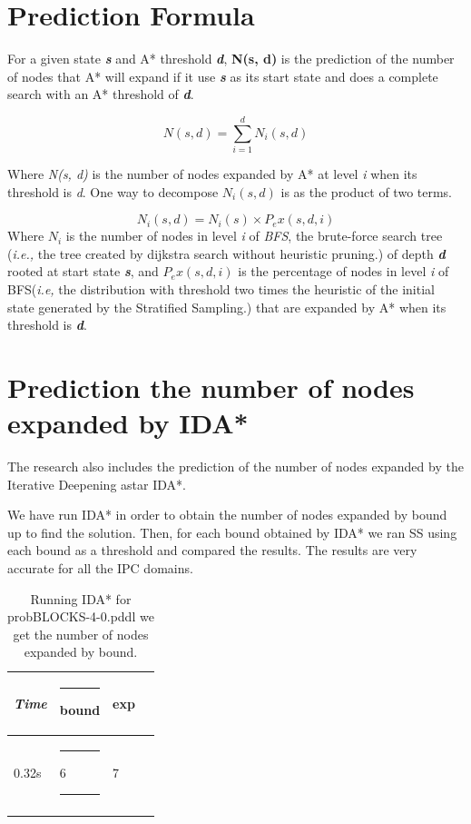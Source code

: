 \documentclass[11pt,a4paper,oneside]{report}
\begin{document}
\section{Prediction Formula}
For a given state \textbf{\textit{s}} and A* threshold \textbf{\textit{d}}, \textbf{N(s, d)} is the prediction of the number of nodes that A* will expand if it use \textbf{\textit{s}} as its start state and does a complete search with an A* threshold of \textbf{\textit{d}}.

\begin{equation}
\label{eq:generalFormula}
N(s, d) =  \sum\limits_{i=1}^dN_i (s,d)
\end{equation}

Where  \textit{N(s, d)} is the number of nodes expanded by A* at level \textit{i} when its threshold is \textit{d}.
One way to decompose \textit{$N_i(s, d)$} is as the product of two terms. \citep{zahavi2010predicting} 

\begin{equation}
\label{eq:partitionFormula}
N_i (s, d) =  N_i (s) \times P_ex (s, d, i)
\end{equation}
\newline
Where $N_i$ is the number of nodes in level \textit{i} of \textit{BFS}, the brute-force search tree (\textit{i.e.,} the tree created by dijkstra search without heuristic pruning.) of depth \textbf{\textit{d}} rooted at start state \textbf{\textit{s}}, and $P_ex (s, d, i)$ is the percentage of nodes in level \textit{i} of BFS(\textit{i.e,} the distribution with threshold two times the heuristic of the initial state generated by the Stratified Sampling.) that are expanded by A* when its threshold is \textbf{\textit{d}}.


\section{Prediction the number of nodes expanded by IDA*}
The research also includes the prediction of the number of nodes expanded by the Iterative Deepening astar IDA*.
\newline

We have run IDA* in order to obtain the number of nodes expanded by bound up to find the solution. Then, for each bound obtained by IDA* we ran SS using each bound as a threshold and compared the results. The results are very accurate for all the IPC domains.

\footnotesize  %
\setlength\LTleft{100pt}            %
\setlength\LTright{200pt}           %
\begin{longtable}{@{\extracolsep{\fill}} llll @{}} %
\hline
\textit{Time} &\rule{4pt}{0ex} bound &\rule{0pt}{0ex} exp \\ \hline
0.32s     &\rule{4pt}{0ex} 6\rule{16pt}{0ex}  & 7                    \\ \hline
\caption{Running IDA* for probBLOCKS-4-0.pddl we get the number of nodes expanded by bound.}
\label{table:tableidaastar}
\end{longtable}
\end{document}
